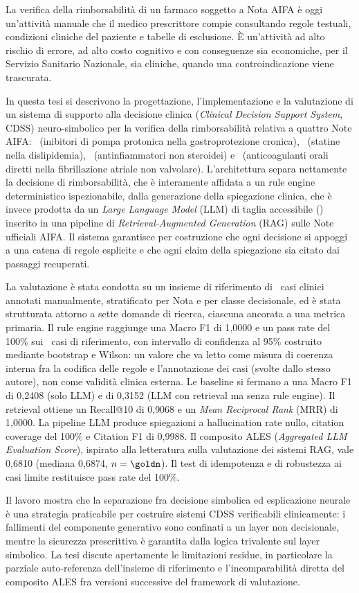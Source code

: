 La verifica della rimborsabilità di un farmaco soggetto a Nota AIFA è oggi un'attività manuale che il medico prescrittore compie consultando regole testuali, condizioni cliniche del paziente e tabelle di esclusione. È un'attività ad alto rischio di errore, ad alto costo cognitivo e con conseguenze sia economiche, per il Servizio Sanitario Nazionale, sia cliniche, quando una controindicazione viene trascurata.

In questa tesi si descrivono la progettazione, l'implementazione e la valutazione di un sistema di supporto alla decisione clinica (\emph{Clinical Decision Support System}, CDSS) neuro-simbolico per la verifica della rimborsabilità relativa a quattro Note AIFA: \notezero\ (inibitori di pompa protonica nella gastroprotezione cronica), \notetredici\ (statine nella dislipidemia), \notesessanta\ (antinfiammatori non steroidei) e \notenova\ (anticoagulanti orali diretti nella fibrillazione atriale non valvolare). L'architettura separa nettamente la decisione di rimborsabilità, che è interamente affidata a un rule engine deterministico ispezionabile, dalla generazione della spiegazione clinica, che è invece prodotta da un \emph{Large Language Model} (LLM) di taglia accessibile (\llmmodel) inserito in una pipeline di \emph{Retrieval-Augmented Generation} (RAG) sulle Note ufficiali AIFA. Il sistema garantisce per costruzione che ogni decisione si appoggi a una catena di regole esplicite e che ogni claim della spiegazione sia citato dai passaggi recuperati.

La valutazione è stata condotta su un insieme di riferimento di \goldn\ casi clinici annotati manualmente, stratificato per Nota e per classe decisionale, ed è stata strutturata attorno a sette domande di ricerca, ciascuna ancorata a una metrica primaria. Il rule engine raggiunge una Macro F1 di 1{,}0000 e un pass rate del 100\% sui \goldn\ casi di riferimento, con intervallo di confidenza al 95\% costruito mediante bootstrap e Wilson: un valore che va letto come misura di coerenza interna fra la codifica delle regole e l'annotazione dei casi (svolte dallo stesso autore), non come validità clinica esterna. Le baseline si fermano a una Macro F1 di 0{,}2408 (solo LLM) e di 0{,}3152 (LLM con retrieval ma senza rule engine). Il retrieval ottiene un Recall@10 di 0{,}9068 e un \emph{Mean Reciprocal Rank} (MRR) di 1{,}0000. La pipeline LLM produce spiegazioni a hallucination rate nullo, citation coverage del 100\% e Citation F1 di 0{,}9988. Il composito ALES (\emph{Aggregated LLM Evaluation Score}), ispirato alla letteratura sulla valutazione dei sistemi RAG, vale 0{,}6810 (mediana 0{,}6874, $n=\goldn$). Il test di idempotenza e di robustezza ai casi limite restituisce pass rate del 100\%.

Il lavoro mostra che la separazione fra decisione simbolica ed esplicazione neurale è una strategia praticabile per costruire sistemi CDSS verificabili clinicamente: i fallimenti del componente generativo sono confinati a un layer non decisionale, mentre la sicurezza prescrittiva è garantita dalla logica trivalente sul layer simbolico. La tesi discute apertamente le limitazioni residue, in particolare la parziale auto-referenza dell'insieme di riferimento e l'incomparabilità diretta del composito ALES fra versioni successive del framework di valutazione.
